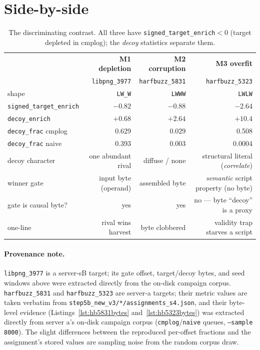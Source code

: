 \documentclass[11pt]{article}
\newcommand{\ste}{\texttt{signed\_target\_enrich}}
\newcommand{\de}{\texttt{decoy\_enrich}}
\begin{document}
\section{Side-by-side}
\begin{table}[h]\centering
\caption{The discriminating contrast. All three have \ste{}$<0$ (target
depleted in cmplog); the \emph{decoy} statistics separate them.}
\label{tab:contrast}
\begin{tabular}{@{}lrrr@{}}
\toprule
 & \textbf{M1 depletion} & \textbf{M2 corruption} & \textbf{M3 overfit} \\
 & \texttt{libpng\_3977} & \texttt{harfbuzz\_5831} & \texttt{harfbuzz\_5323} \\
\midrule
shape                         & \texttt{LW\_W} & \texttt{LWWW} & \texttt{LWLW} \\
\ste{}                        & $-0.82$ & $-0.88$ & $-2.64$ \\
\de{}                         & $+0.68$ & $+2.64$ & $+10.4$ \\
\texttt{decoy\_frac} cmplog   & 0.629 & 0.029 & 0.508 \\
\texttt{decoy\_frac} naive    & 0.393 & 0.003 & 0.0004 \\
decoy character               & one abundant rival & diffuse / none & structural literal (\emph{correlate}) \\
winner gate                   & input byte (operand) & assembled byte & \emph{semantic} script property (no byte) \\
gate is causal byte?          & yes & yes & no --- byte ``decoy'' is a proxy \\
one-line                      & rival wins harvest & byte clobbered & validity trap starves a script \\
\bottomrule
\end{tabular}
\end{table}

\paragraph{Provenance note.} \texttt{libpng\_3977} is a server-sB target;
its gate offset, target/decoy bytes, and seed windows above were extracted
directly from the on-disk campaign corpus. \texttt{harfbuzz\_5831} and
\texttt{harfbuzz\_5323} are server-a targets; their metric values are taken
verbatim from \texttt{step5b\_new\_v3/*/assignments\_s4.json}, and their
byte-level evidence (Listings~\ref{lst:hb5831bytes} and~\ref{lst:hb5323bytes})
was extracted directly from server a's on-disk campaign corpus
(\texttt{cmplog}/\texttt{naive} queues, \texttt{--sample 8000}). The slight
differences between the reproduced per-offset fractions and the assignment's
stored values are sampling noise from the random corpus draw.
\end{document}
